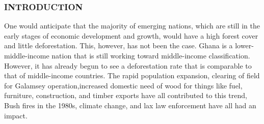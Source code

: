\documentclass[11pt]{beamer}
\begin{document}
%     
 \begin{frame}
 	\frametitle{INTRODUCTION}
 	\begin{block}{}
 	One would anticipate that the majority of emerging nations, which are still in the early stages of economic development and growth, would have a high forest cover and little deforestation. This, however, has not been the case. Ghana is a lower-middle-income nation that is still working toward middle-income classification. However, it has already begun to see a deforestation rate that is comparable to that of middle-income countries. The rapid population expansion, clearing of field for Galamsey operation,increased domestic need of wood for things like fuel, furniture, construction, and timber exports have all contributed to this trend, Bush fires in the 1980s, climate change, and lax law enforcement have all had an impact.
 	
 	\end{block}
 	
 \end{frame}
\end{document}
